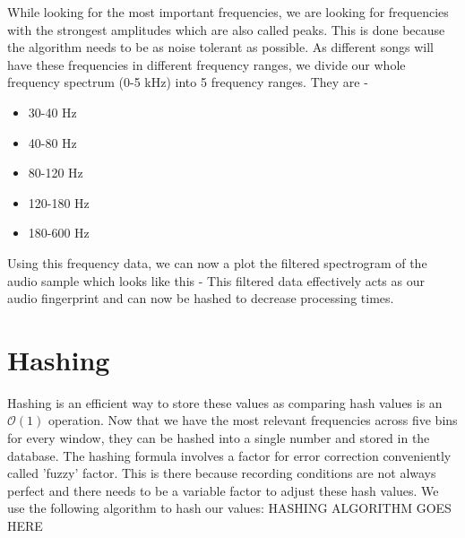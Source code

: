 \documentclass[12pt, a4paper]{IEEEtran}
\begin{document}
While looking for the most important frequencies, we are looking for frequencies with the strongest amplitudes which are also called peaks. This is done because the algorithm needs to be as noise tolerant as possible. As different songs will have these frequencies in different frequency ranges, we divide our whole frequency spectrum (0-5 kHz) into 5 frequency ranges. They are -
\begin{itemize}
    \item 30-40 Hz
    \item 40-80 Hz
    \item 80-120 Hz
    \item 120-180 Hz
    \item 180-600 Hz
\end{itemize}
Using this frequency data, we can now a plot the filtered spectrogram of the audio sample which looks like this -
This filtered data effectively acts as our audio fingerprint and can now be hashed to decrease processing times.

\section{Hashing}
Hashing is an efficient way to store these values as comparing hash values is an \(\mathcal{O}(1)\) operation.
Now that we have the most relevant frequencies across five bins for every window, they can be hashed into a single number and stored in the database. The hashing formula involves a factor for error correction conveniently called 'fuzzy' factor. This is there because recording conditions are not always perfect and there needs to be a variable factor to adjust these hash values.
We use the following algorithm to hash our values:
HASHING ALGORITHM GOES HERE
\end{document}
